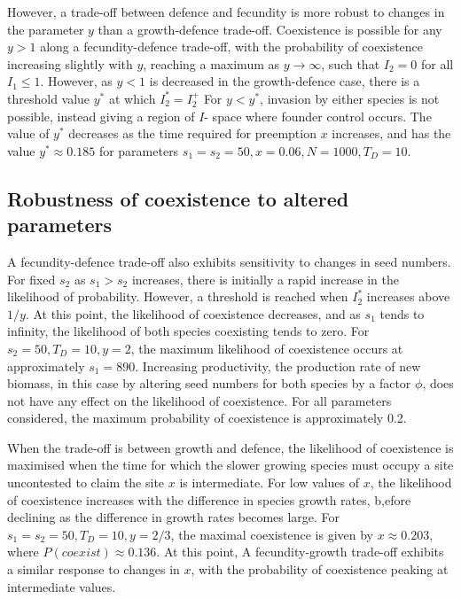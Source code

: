 \documentclass[a4paper]{article}
\begin{document}
However, a trade-off between defence and fecundity is more robust to changes in the parameter $y$ than a growth-defence trade-off. Coexistence is possible for any $y>1$ along a fecundity-defence trade-off, with the probability of coexistence increasing slightly with $y$, reaching a maximum as $y \to \infty$, such that $I_2=0$ for all $I_1 \leq 1$. However, as $y<1$ is decreased in the growth-defence case, there is a threshold value $y^*$ at which $I_2^*=I_2^+$ For $y<y^*$, invasion by either species is not possible, instead giving a region of $I$- space where founder control occurs. The value of $y^*$ decreases as the time required for preemption $x$ increases, and has the value $y^* \approx 0.185$ for parameters $s_1=s_2=50,x=0.06,N=1000,T_D=10$.

\subsection{Robustness of coexistence to altered parameters}
A fecundity-defence trade-off also exhibits sensitivity to changes in seed numbers. For fixed $s_2$ as $s_1>s_2$ increases, there is initially a rapid increase in the likelihood of probability. However, a threshold is reached when $I_2^*$ increases above $1/y$. At this point, the likelihood of coexistence decreases, and as $s_1$ tends to infinity, the likelihood of both species coexisting tends to zero. For $s_2=50,T_D=10,y=2$, the maximum likelihood of coexistence occurs at approximately $s_1=890$. Increasing productivity, the production rate of new biomass, in this case by altering seed numbers for both species by a factor $\phi$, does not have any effect on the likelihood of coexistence. For all parameters considered, the maximum probability of coexistence is approximately 0.2.

When the trade-off is between growth and defence, the likelihood of coexistence is maximised when the time for which the slower growing species must occupy a site uncontested to claim the site $x$ is intermediate. For low values of $x$, the likelihood of coexistence increases with the difference in species growth rates, b,efore declining as the difference in growth rates becomes large. For $s_1=s_2=50,T_D=10,y=2/3$, the maximal coexistence is given by $x \approx 0.203$, where $P(coexist)\approx 0.136$. At this point,  A fecundity-growth trade-off exhibits a similar response to changes in $x$, with the probability of coexistence peaking at intermediate values.
\end{document}
